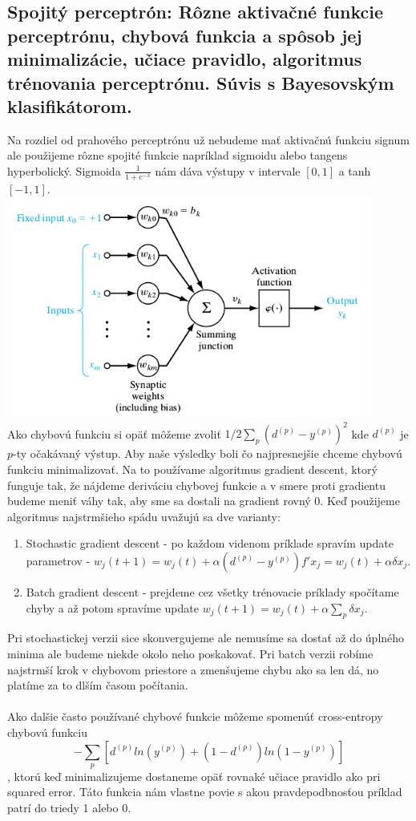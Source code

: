\documentclass{article}
\numberwithin{equation}{section} %
\begin{document}
\subsection{Spojitý perceptrón: Rôzne aktivačné funkcie perceptrónu, chybová funkcia a spôsob jej minimalizácie, učiace pravidlo, algoritmus trénovania perceptrónu. Súvis s Bayesovským klasifikátorom.}
Na rozdiel od prahového perceptrónu už nebudeme mať aktivačnú funkciu signum ale použijeme rôzne spojité funkcie napríklad sigmoidu alebo tangens hyperbolický. Sigmoida $\frac{1}{1 + e^{-x}}$ nám dáva výstupy v intervale $[0, 1]$ a tanh $[-1, 1]$.\\
\includegraphics[width=12cm]{imgs/cont_neuron}\\
Ako chybovú funkciu si opäť môžeme zvoliť $1/2 \sum_p (d^{(p)}- y^{(p)})^2$ kde $d^{(p)}$ je $p$-ty očakávaný výstup. Aby naše výsledky boli čo najpresnejšie chceme chybovú funkciu minimalizovať. Na to používame algoritmus gradient descent, ktorý funguje tak, že nájdeme deriváciu chybovej funkcie a v smere proti gradientu budeme meniť váhy tak, aby sme sa dostali na gradient rovný 0. Keď použijeme algoritmus najstrmšieho spádu uvažujú sa dve varianty:
\begin{enumerate}
\item Stochastic gradient descent - po každom videnom príklade spravím update parametrov - $w_j(t+1) = w_j(t) + \alpha(d^{(p)} - y^{(p)})f'x_j = w_j(t) + \alpha\delta x_j$. 
\item Batch gradient descent - prejdeme cez všetky trénovacie príklady spočítame chyby a až potom spravíme update $w_j(t+1) = w_j(t) + \alpha \sum_p \delta x_j$.
\end{enumerate}
Pri stochastickej verzii sice skonvergujeme ale nemusíme sa dostať až do úplného minima ale budeme niekde okolo neho poskakovať. Pri batch verzii robíme najstrmší krok v chybovom priestore a zmenšujeme chybu ako sa len dá, no platíme za to dlším časom počítania. \\\\
Ako dalšie často používané chybové funkcie môžeme spomenúť cross-entropy chybovú funkciu $$-\sum_p [d^{(p)} ln (y^{(p)}) + (1 - d^{(p)})ln(1-y^{(p)})]$$, ktorú keď minimalizujeme dostaneme opäť rovnaké učiace pravidlo ako pri squared error. Táto funkcia nám vlastne povie s akou pravdepodbnosťou príklad patrí do triedy 1 alebo 0.
\end{document}
